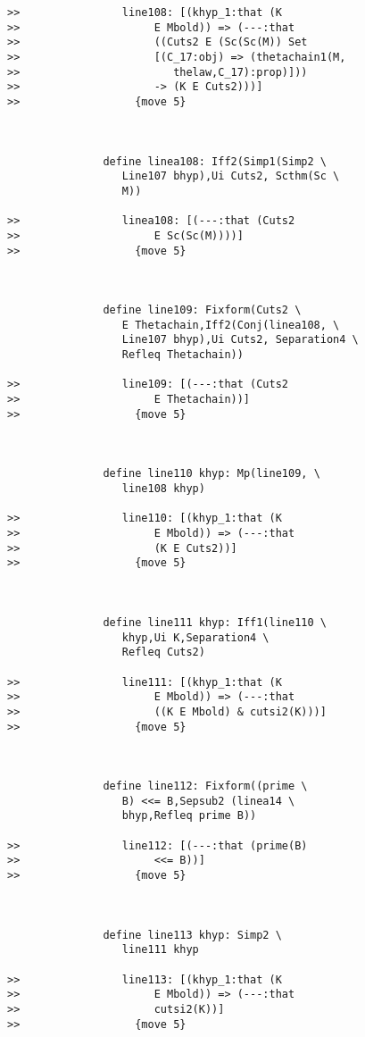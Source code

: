 \documentclass[12pt]{article}
\begin{document}
\begin{verbatim}
>>                line108: [(khyp_1:that (K
>>                     E Mbold)) => (---:that
>>                     ((Cuts2 E (Sc(Sc(M)) Set
>>                     [(C_17:obj) => (thetachain1(M,
>>                        thelaw,C_17):prop)]))
>>                     -> (K E Cuts2)))]
>>                  {move 5}



               define linea108: Iff2(Simp1(Simp2 \
                  Line107 bhyp),Ui Cuts2, Scthm(Sc \
                  M))

>>                linea108: [(---:that (Cuts2
>>                     E Sc(Sc(M))))]
>>                  {move 5}



               define line109: Fixform(Cuts2 \
                  E Thetachain,Iff2(Conj(linea108, \
                  Line107 bhyp),Ui Cuts2, Separation4 \
                  Refleq Thetachain))

>>                line109: [(---:that (Cuts2
>>                     E Thetachain))]
>>                  {move 5}



               define line110 khyp: Mp(line109, \
                  line108 khyp)

>>                line110: [(khyp_1:that (K
>>                     E Mbold)) => (---:that
>>                     (K E Cuts2))]
>>                  {move 5}



               define line111 khyp: Iff1(line110 \
                  khyp,Ui K,Separation4 \
                  Refleq Cuts2)

>>                line111: [(khyp_1:that (K
>>                     E Mbold)) => (---:that
>>                     ((K E Mbold) & cutsi2(K)))]
>>                  {move 5}



               define line112: Fixform((prime \
                  B) <<= B,Sepsub2 (linea14 \
                  bhyp,Refleq prime B))

>>                line112: [(---:that (prime(B)
>>                     <<= B))]
>>                  {move 5}



               define line113 khyp: Simp2 \
                  line111 khyp

>>                line113: [(khyp_1:that (K
>>                     E Mbold)) => (---:that
>>                     cutsi2(K))]
>>                  {move 5}




\end{verbatim}
\end{document}

